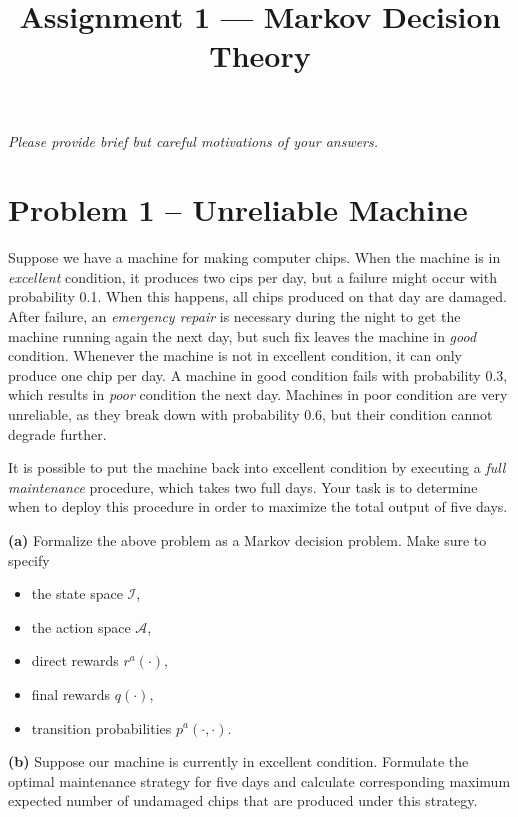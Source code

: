 \documentclass{article}
\title{Assignment 1 --- Markov Decision Theory}
\author{}
\date{}
\begin{document}
\maketitle
\vspace{-5em}

\noindent
\textit{Please provide brief but careful motivations of your answers.}

\section*{Problem 1 -- Unreliable Machine}

Suppose we have a machine for making computer chips.
When the machine is in \textit{excellent} condition, it produces two cips per day, but
a failure might occur with probability 0.1. 
When this happens, all chips produced on that day are damaged.
After failure, an \textit{emergency repair} is necessary during the night to get the machine running again the next day, but such fix leaves the machine in \textit{good} condition.
Whenever the machine is not in excellent condition, it can only produce one chip per day.
A machine in good condition fails with probability 0.3, which results in \textit{poor} condition the next day.
Machines in poor condition are very unreliable, as they break down with probability 0.6, but their condition cannot degrade further.

It is possible to put the machine back into excellent condition by executing a \textit{full maintenance} procedure, which takes two full days.
Your task is to determine when to deploy this procedure in order to maximize the total output of five days.


\vspace{1em}
\noindent
\textbf{(a)}
Formalize the above problem as a Markov decision problem. Make sure to specify
\begin{itemize}
    \item the state space $\mathcal{I}$,
    \item the action space $\mathcal{A}$,
    \item direct rewards $r^{a}(\cdot)$,
    \item final rewards $q(\cdot)$,
    \item transition probabilities $p^{a}(\cdot, \cdot)$.
\end{itemize}

\vspace{1em}
\noindent
\textbf{(b)}
Suppose our machine is currently in excellent condition.
Formulate the optimal maintenance strategy for five days and calculate corresponding maximum expected number of undamaged chips that are produced under this strategy.
\end{document}
